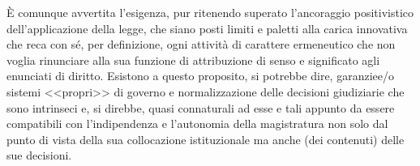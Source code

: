 È comunque avvertita l'esigenza, pur ritenendo superato l'ancoraggio positivistico dell'applicazione della legge, che siano posti limiti e paletti alla carica innovativa che reca con sé, per definizione, ogni attività di carattere ermeneutico che non voglia rinunciare alla sua funzione di attribuzione di senso e significato agli enunciati di diritto. Esistono a questo proposito, si potrebbe dire, garanziee/o sistemi <<propri>> di governo e normalizzazione delle decisioni giudiziarie che sono intrinseci e, si direbbe, quasi connaturali ad esse e tali appunto da essere compatibili con l'indipendenza e l'autonomia della magistratura non solo dal punto di vista della sua collocazione istituzionale ma anche (dei contenuti) delle sue decisioni. 

\begin{comment}
È questo il sistema delle impugnazioni, cioè della emendabilità delle decisioni, ma emendabilità delle decisioni non può non voler dire che interpretazione a mezzo di interpretazione. Il che significa, in un ordinamento fondato sul principio di legalità (obbedienza del giudice alla legge) ma anche sull'indipendenza e autonomia dei giudici (art. 101 Cost.), che non v'è altro sistema possibile di controllo della legalità se non sul terreno della emendabilità delle decisioni in ragione di un diverso apprezzamento dei fatti (quando possibile) e di un diverso criterio di ermeneutica Interpretazione a mezzo di interpretazione è lo snodo irrinunciabile di un controllo delle decisioni giudiziarie che rifiuti ogni modello autoritativo di intervento dall'esterno. Altre tecniche, da definirsi improprie, sono quelle extraprocessuali che, guardando al comportamento del magistrato (e non alla interpretazione da esso effettuata), lo valutano in chiave di illiceità (disciplinare o di responsabilità civile) in presenza di interpretazioni abnormi e/o frutto di negligenza inescusabile, ma questo argomento esorbita dalle finalità del presente scritto.
\end{comment}

